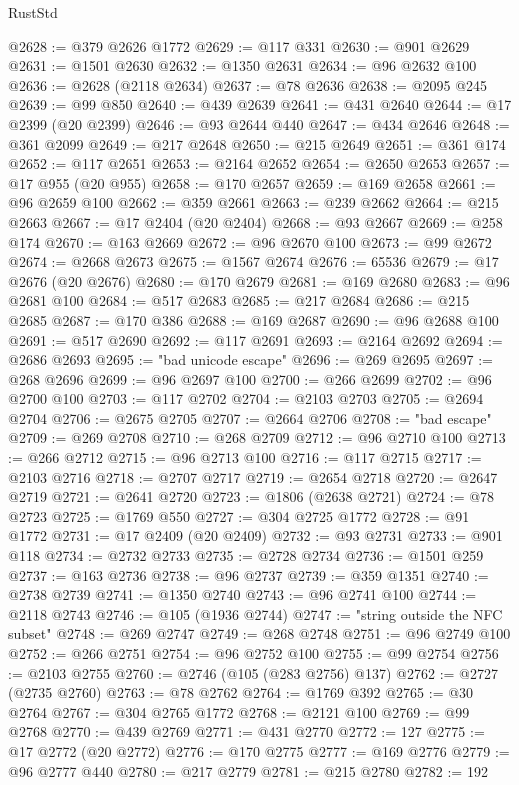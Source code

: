 \begin{lexlean}{RustStd}
\begin{coremodule}
@2628 := @379 @2626 @1772
@2629 := @117 @331
@2630 := @901 @2629
@2631 := @1501 @2630
@2632 := @1350 @2631
@2634 := @96 @2632 @100
@2636 := @2628 (@2118 @2634)
@2637 := @78 @2636
@2638 := @2095 @245
@2639 := @99 @850
@2640 := @439 @2639
@2641 := @431 @2640
@2644 := @17 @2399 (@20 @2399)
@2646 := @93 @2644 @440
@2647 := @434 @2646
@2648 := @361 @2099
@2649 := @217 @2648
@2650 := @215 @2649
@2651 := @361 @174
@2652 := @117 @2651
@2653 := @2164 @2652
@2654 := @2650 @2653
@2657 := @17 @955 (@20 @955)
@2658 := @170 @2657
@2659 := @169 @2658
@2661 := @96 @2659 @100
@2662 := @359 @2661
@2663 := @239 @2662
@2664 := @215 @2663
@2667 := @17 @2404 (@20 @2404)
@2668 := @93 @2667
@2669 := @258 @174
@2670 := @163 @2669
@2672 := @96 @2670 @100
@2673 := @99 @2672
@2674 := @2668 @2673
@2675 := @1567 @2674
@2676 := 65536
@2679 := @17 @2676 (@20 @2676)
@2680 := @170 @2679
@2681 := @169 @2680
@2683 := @96 @2681 @100
@2684 := @517 @2683
@2685 := @217 @2684
@2686 := @215 @2685
@2687 := @170 @386
@2688 := @169 @2687
@2690 := @96 @2688 @100
@2691 := @517 @2690
@2692 := @117 @2691
@2693 := @2164 @2692
@2694 := @2686 @2693
@2695 := "bad unicode escape"
@2696 := @269 @2695
@2697 := @268 @2696
@2699 := @96 @2697 @100
@2700 := @266 @2699
@2702 := @96 @2700 @100
@2703 := @117 @2702
@2704 := @2103 @2703
@2705 := @2694 @2704
@2706 := @2675 @2705
@2707 := @2664 @2706
@2708 := "bad escape"
@2709 := @269 @2708
@2710 := @268 @2709
@2712 := @96 @2710 @100
@2713 := @266 @2712
@2715 := @96 @2713 @100
@2716 := @117 @2715
@2717 := @2103 @2716
@2718 := @2707 @2717
@2719 := @2654 @2718
@2720 := @2647 @2719
@2721 := @2641 @2720
@2723 := @1806 (@2638 @2721)
@2724 := @78 @2723
@2725 := @1769 @550
@2727 := @304 @2725 @1772
@2728 := @91 @1772
@2731 := @17 @2409 (@20 @2409)
@2732 := @93 @2731
@2733 := @901 @118
@2734 := @2732 @2733
@2735 := @2728 @2734
@2736 := @1501 @259
@2737 := @163 @2736
@2738 := @96 @2737
@2739 := @359 @1351
@2740 := @2738 @2739
@2741 := @1350 @2740
@2743 := @96 @2741 @100
@2744 := @2118 @2743
@2746 := @105 (@1936 @2744)
@2747 := "string outside the NFC subset"
@2748 := @269 @2747
@2749 := @268 @2748
@2751 := @96 @2749 @100
@2752 := @266 @2751
@2754 := @96 @2752 @100
@2755 := @99 @2754
@2756 := @2103 @2755
@2760 := @2746 (@105 (@283 @2756) @137)
@2762 := @2727 (@2735 @2760)
@2763 := @78 @2762
@2764 := @1769 @392
@2765 := @30 @2764
@2767 := @304 @2765 @1772
@2768 := @2121 @100
@2769 := @99 @2768
@2770 := @439 @2769
@2771 := @431 @2770
@2772 := 127
@2775 := @17 @2772 (@20 @2772)
@2776 := @170 @2775
@2777 := @169 @2776
@2779 := @96 @2777 @440
@2780 := @217 @2779
@2781 := @215 @2780
@2782 := 192

\end{coremodule}
\end{lexlean}
